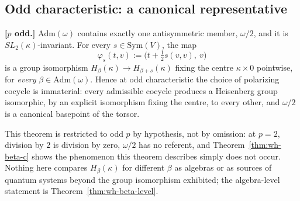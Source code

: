 \subsection{Odd characteristic: a canonical representative}

\statusProvedConditional
\begin{theorem}
\label{thm:wh-beta-b}
\textbf{[$p$ odd.]} $\mathrm{Adm}(\omega)$ contains exactly one antisymmetric
member, $\omega/2$, and it is $SL_2(\kappa)$-invariant. For every
$s\in\mathrm{Sym}(V)$, the map
\[
\varphi_s(t,v) := \Big(t + \tfrac{1}{2}s(v,v),\ v\Big)
\]
is a group isomorphism $H_\beta(\kappa)\to H_{\beta+s}(\kappa)$ fixing the
centre $\kappa\times 0$ pointwise, for \emph{every} $\beta\in\mathrm{Adm}(\omega)$.
Hence at odd characteristic the choice of polarizing cocycle is immaterial:
every admissible cocycle produces a Heisenberg group isomorphic, by an
explicit isomorphism fixing the centre, to every other, and $\omega/2$ is a
canonical basepoint of the torsor.
\end{theorem}

\begin{scope}
This theorem is restricted to odd $p$ by hypothesis, not by omission: at
$p=2$, division by $2$ is division by zero, $\omega/2$ has no referent, and
Theorem~\ref{thm:wh-beta-c} shows the phenomenon this theorem describes
simply does not occur. Nothing here compares $H_\beta(\kappa)$ for different
$\beta$ as algebras or as sources of quantum systems beyond the group
isomorphism exhibited; the algebra-level statement is
Theorem~\ref{thm:wh-beta-level}.
\end{scope}


